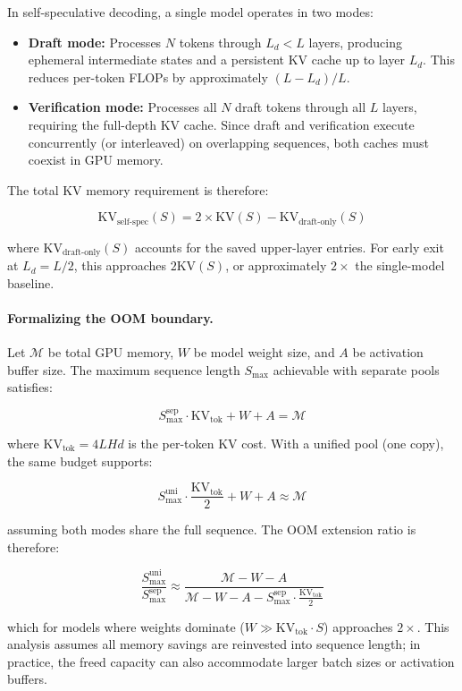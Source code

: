 \documentclass[review]{elsarticle}
\theoremstyle{definition}
\theoremstyle{remark}
\begin{document}
In self-speculative decoding, a single model operates in two modes:

\begin{itemize}
    \item \textbf{Draft mode:} Processes $N$ tokens through $L_d < L$ layers,
    producing ephemeral intermediate states and a persistent KV cache up to
    layer $L_d$. This reduces per-token FLOPs by approximately
    $(L - L_d)/L$.
    \item \textbf{Verification mode:} Processes all $N$ draft tokens through
    all $L$ layers, requiring the full-depth KV cache. Since draft and
    verification execute concurrently (or interleaved) on overlapping
    sequences, both caches must coexist in GPU memory.
\end{itemize}

The total KV memory requirement is therefore:

\[
\text{KV}_\text{self-spec}(S) = 2 \times \text{KV}(S) -
    \text{KV}_\text{draft-only}(S)
\]

where $\text{KV}_\text{draft-only}(S)$ accounts for the saved upper-layer
entries. For early exit at $L_d = L/2$, this approaches $2\text{KV}(S)$,
or approximately $2\times$ the single-model baseline.

\paragraph{Formalizing the OOM boundary.}
Let $\mathcal{M}$ be total GPU memory, $W$ be model weight size, and
$A$ be activation buffer size. The maximum sequence length $S_\text{max}$
achievable with separate pools satisfies:

\[
S_\text{max}^\text{sep} \cdot \text{KV}_\text{tok} + W + A = \mathcal{M}
\]

where $\text{KV}_\text{tok} = 4 L H d$ is the per-token KV cost.
With a unified pool (one copy), the same budget supports:

\[
S_\text{max}^\text{uni} \cdot \frac{\text{KV}_\text{tok}}{2} + W + A
    \approx \mathcal{M}
\]

assuming both modes share the full sequence. The OOM extension ratio is
therefore:

\[
\frac{S_\text{max}^\text{uni}}{S_\text{max}^\text{sep}} \approx
    \frac{\mathcal{M} - W - A}{\mathcal{M} - W - A - S_\text{max}^\text{sep}
    \cdot \frac{\text{KV}_\text{tok}}{2}}
\]

which for models where weights dominate ($W \gg \text{KV}_\text{tok} \cdot S$)
approaches $2\times$. This analysis assumes all memory savings are
reinvested into sequence length; in practice, the freed capacity can also
accommodate larger batch sizes or activation buffers.
\end{document}
